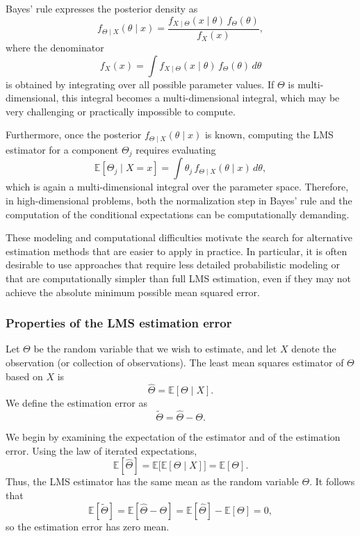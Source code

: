 Bayes' rule expresses the posterior density as
\[
f_{\Theta \mid X}(\theta \mid x)
=
\frac{f_{X \mid \Theta}(x \mid \theta)\,f_{\Theta}(\theta)}{f_{X}(x)},
\]
where the denominator
\[
f_{X}(x)
=
\int f_{X \mid \Theta}(x \mid \theta)\,f_{\Theta}(\theta)\,d\theta
\]
is obtained by integrating over all possible parameter values.  
If \(\Theta\) is multi-dimensional, this integral becomes a multi-dimensional integral, which may be very challenging or practically impossible to compute.

Furthermore, once the posterior \(f_{\Theta \mid X}(\theta \mid x)\) is known, computing the LMS estimator for a component \(\Theta_{j}\) requires evaluating
\[
\mathbb{E}[\Theta_{j} \mid X = x]
=
\int \theta_{j}\, f_{\Theta \mid X}(\theta \mid x)\,d\theta,
\]
which is again a multi-dimensional integral over the parameter space.  
Therefore, in high-dimensional problems, both the normalization step in Bayes' rule and the computation of the conditional expectations can be computationally demanding.

These modeling and computational difficulties motivate the search for alternative estimation methods that are easier to apply in practice.  
In particular, it is often desirable to use approaches that require less detailed probabilistic modeling or that are computationally simpler than full LMS estimation, even if they may not achieve the absolute minimum possible mean squared error.



\subsubsection{Properties of the LMS estimation error}

Let \(\Theta\) be the random variable that we wish to estimate, and let \(X\) denote the observation (or collection of observations).  
The least mean squares estimator of \(\Theta\) based on \(X\) is
\[
\hat{\Theta}
=
\mathbb{E}[\Theta \mid X].
\]
We define the estimation error as
\[
\tilde{\Theta}
=
\hat{\Theta} - \Theta.
\]

We begin by examining the expectation of the estimator and of the estimation error.  
Using the law of iterated expectations,
\[
\mathbb{E}[\hat{\Theta}]
=
\mathbb{E}\big[\mathbb{E}[\Theta \mid X]\big]
=
\mathbb{E}[\Theta].
\]
Thus, the LMS estimator has the same mean as the random variable \(\Theta\).  
It follows that
\[
\mathbb{E}[\tilde{\Theta}]
=
\mathbb{E}[\hat{\Theta} - \Theta]
=
\mathbb{E}[\hat{\Theta}] - \mathbb{E}[\Theta]
=
0,
\]
so the estimation error has zero mean.

